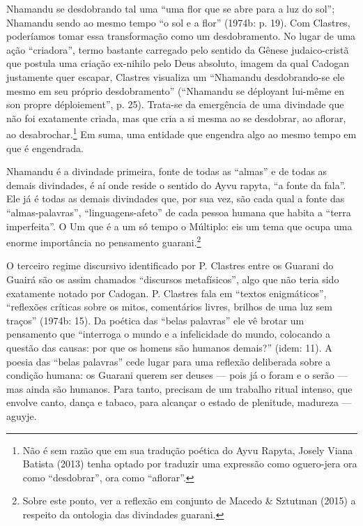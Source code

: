 \documentclass{article}
\begin{document}
Nhamandu se desdobrando tal uma {\textquotedblleft}uma flor que se abre
para a luz do sol{\textquotedblright}; Nhamandu sendo ao mesmo tempo
{\textquotedblleft}o sol e a flor{\textquotedblright} (1974b: p. 19).
Com Clastres, poder\'iamos tomar essa transforma\c{c}\~ao como um
desdobramento. No lugar de uma a\c{c}\~ao
{\textquotedblleft}criadora{\textquotedblright}, termo bastante
carregado pelo sentido da G\^enese judaico-crist\~a que postula uma
cria\c{c}\~ao ex-nihilo pelo Deus absoluto, imagem da qual Cadogan
justamente quer escapar, Clastres visualiza um
{\textquotedblleft}Nhamandu desdobrando-se ele mesmo em seu pr\'oprio
desdobramento{\textquotedblright} ({\textquotedblleft}Nhamandu se
d\'eployant lui-m\^eme en son propre d\'eploiement{\textquotedblright},
p. 25). Trata-se da emerg\^encia de uma divindade que n\~ao foi
exatamente criada, mas que cria a si mesma ao se desdobrar, ao aflorar,
ao desabrochar.\footnote{ N\~ao \'e sem raz\~ao que em sua
tradu\c{c}\~ao po\'etica do Ayvu Rapyta, Josely Viana Batista (2013)
tenha optado por traduzir uma express\~ao como oguero-jera ora como
{\textquotedblleft}desdobrar{\textquotedblright}, ora como
{\textquotedblleft}aflorar{\textquotedblright}.}  Em suma, uma entidade
que engendra algo ao mesmo tempo em que \'e engendrada.

Nhamandu \'e a divindade primeira, fonte de todas as
{\textquotedblleft}almas{\textquotedblright} e de todas as demais
divindades, \'e a\'i onde reside o sentido do Ayvu rapyta,
{\textquotedblleft}a fonte da fala{\textquotedblright}. Ele j\'a \'e
todas as demais divindades que, por sua vez, s\~ao cada qual a fonte
das {\textquotedblleft}almas-palavras{\textquotedblright},
{\textquotedblleft}linguagens-afeto{\textquotedblright} de cada pessoa
humana que habita a {\textquotedblleft}terra
imperfeita{\textquotedblright}. O Um que \'e a um s\'o tempo o
M\'ultiplo: eis um tema que ocupa uma enorme import\^ancia no
pensamento guarani.\footnote{ Sobre este ponto, ver a reflex\~ao em
conjunto de Macedo \& Sztutman (2015) a respeito da ontologia das
divindades guarani.}

O terceiro regime discursivo identificado por P. Clastres entre os
Guarani do Guair\'a s\~ao os assim chamados
{\textquotedblleft}discursos metaf\'isicos{\textquotedblright}, algo
que n\~ao teria sido exatamente notado por Cadogan. P. Clastres fala em
{\textquotedblleft}textos enigm\'aticos{\textquotedblright},
{\textquotedblleft}reflex\~oes cr\'iticas sobre os mitos, coment\'arios
livres, brilhos de uma luz sem tra\c{c}os{\textquotedblright} (1974b:
15). Da po\'etica das {\textquotedblleft}belas
palavras{\textquotedblright} ele v\^e brotar um pensamento que
{\textquotedblleft}interroga o mundo e a infelicidade do mundo,
colocando a quest\~ao das causas: por que os homens s\~ao humanos
demais?{\textquotedblright} (idem: 11). A poesia das
{\textquotedblleft}belas palavras{\textquotedblright} cede lugar para
uma reflex\~ao deliberada sobre a condi\c{c}\~ao humana: os Guarani
querem ser deuses --- pois j\'a o foram e o ser\~ao --- mas ainda s\~ao
humanos. Para tanto, precisam de um trabalho ritual intenso, que
envolve canto, dan\c{c}a e tabaco, para alcan\c{c}ar o estado de
plenitude, madureza --- aguyje. 
\end{document}
